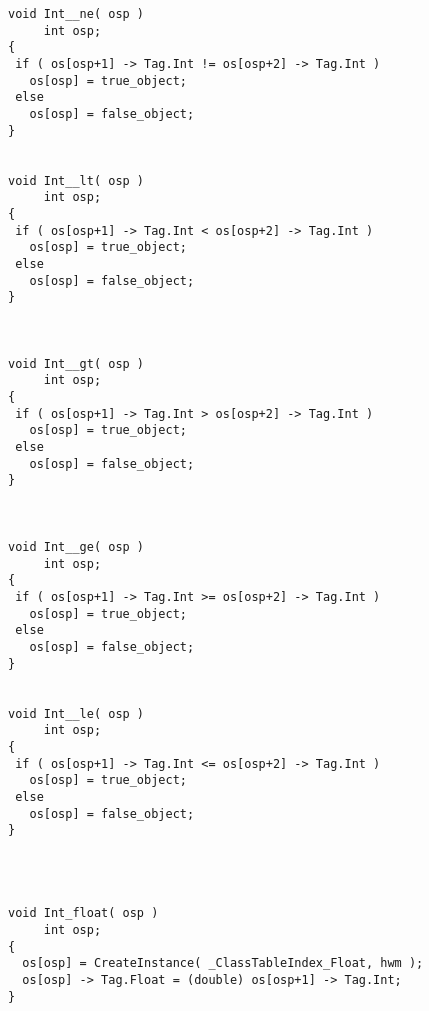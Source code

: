 {\begin{verbatim}
void Int__ne( osp )
     int osp;
{
 if ( os[osp+1] -> Tag.Int != os[osp+2] -> Tag.Int )
   os[osp] = true_object;
 else
   os[osp] = false_object;
}


void Int__lt( osp )
     int osp;
{
 if ( os[osp+1] -> Tag.Int < os[osp+2] -> Tag.Int )
   os[osp] = true_object;
 else
   os[osp] = false_object;
}



void Int__gt( osp )
     int osp;
{
 if ( os[osp+1] -> Tag.Int > os[osp+2] -> Tag.Int )
   os[osp] = true_object;
 else
   os[osp] = false_object;
}



void Int__ge( osp )
     int osp;
{
 if ( os[osp+1] -> Tag.Int >= os[osp+2] -> Tag.Int )
   os[osp] = true_object;
 else
   os[osp] = false_object;
}


void Int__le( osp )
     int osp;
{
 if ( os[osp+1] -> Tag.Int <= os[osp+2] -> Tag.Int )
   os[osp] = true_object;
 else
   os[osp] = false_object;
}




void Int_float( osp )
     int osp;
{
  os[osp] = CreateInstance( _ClassTableIndex_Float, hwm );
  os[osp] -> Tag.Float = (double) os[osp+1] -> Tag.Int;
}

\end{verbatim}}
